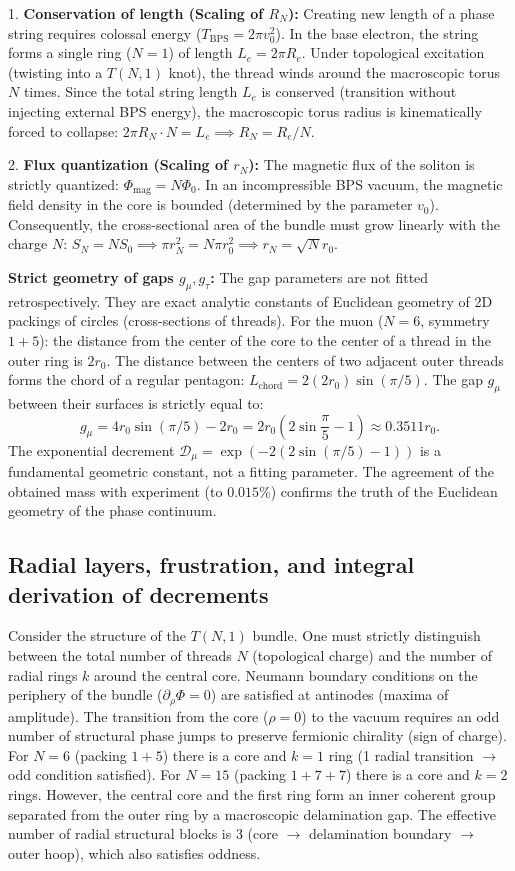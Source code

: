 \documentclass[11pt,a4paper]{article}
\begin{document}
1. \textbf{Conservation of length (Scaling of $R_N$):} Creating new length of a phase string requires colossal energy ($T_{\text{BPS}} = 2\pi v_0^2$). In the base electron, the string forms a single ring ($N=1$) of length $L_e = 2\pi R_e$. Under topological excitation (twisting into a $T(N,1)$ knot), the thread winds around the macroscopic torus $N$ times. Since the total string length $L_e$ is conserved (transition without injecting external BPS energy), the macroscopic torus radius is kinematically forced to collapse: $2\pi R_N \cdot N = L_e \implies R_N = R_e/N$.

2. \textbf{Flux quantization (Scaling of $r_N$):} The magnetic flux of the soliton is strictly quantized: $\Phi_{\text{mag}} = N \Phi_0$. In an incompressible BPS vacuum, the magnetic field density in the core is bounded (determined by the parameter $v_0$). Consequently, the cross-sectional area of the bundle must grow linearly with the charge $N$: $S_N = N S_0 \implies \pi r_N^2 = N \pi r_0^2 \implies r_N = \sqrt{N} r_0$.

\textbf{Strict geometry of gaps $g_\mu, g_\tau$:}
The gap parameters are not fitted retrospectively. They are exact analytic constants of Euclidean geometry of 2D packings of circles (cross-sections of threads).
For the muon ($N=6$, symmetry $1+5$): the distance from the center of the core to the center of a thread in the outer ring is $2r_0$. The distance between the centers of two adjacent outer threads forms the chord of a regular pentagon: $L_{\text{chord}} = 2 (2r_0) \sin(\pi/5)$. The gap $g_\mu$ between their surfaces is strictly equal to:
\begin{equation}
g_\mu = 4r_0 \sin(\pi/5) - 2r_0 = 2r_0 \left( 2\sin\frac{\pi}{5} - 1 \right) \approx 0.3511 r_0.
\end{equation}
The exponential decrement $\mathcal{D}_\mu = \exp(-2(2\sin(\pi/5)-1))$ is a fundamental geometric constant, not a fitting parameter. The agreement of the obtained mass with experiment (to $0.015\%$) confirms the truth of the Euclidean geometry of the phase continuum.

\subsection{Radial layers, frustration, and integral derivation of decrements}
Consider the structure of the $T(N,1)$ bundle. One must strictly distinguish between the total number of threads $N$ (topological charge) and the number of radial rings $k$ around the central core. 
Neumann boundary conditions on the periphery of the bundle ($\partial_\rho \Phi = 0$) are satisfied at antinodes (maxima of amplitude). The transition from the core ($\rho=0$) to the vacuum requires an odd number of structural phase jumps to preserve fermionic chirality (sign of charge).
For $N=6$ (packing $1+5$) there is a core and $k=1$ ring (1 radial transition $\to$ odd condition satisfied).
For $N=15$ (packing $1+7+7$) there is a core and $k=2$ rings. However, the central core and the first ring form an inner coherent group separated from the outer ring by a macroscopic delamination gap. The effective number of radial structural blocks is 3 (core $\to$ delamination boundary $\to$ outer hoop), which also satisfies oddness.
\end{document}
